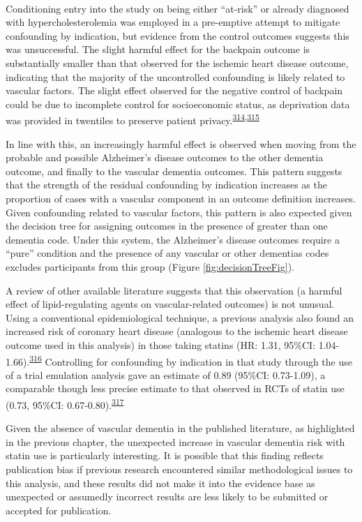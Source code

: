 \documentclass[a4paper, twoside]{templates/ociamthesis}
\begin{document}
~

Conditioning entry into the study on being either ``at-risk'' or already diagnosed with hypercholesterolemia was employed in a pre-emptive attempt to mitigate confounding by indication, but evidence from the control outcomes suggests this was unsuccessful. The slight harmful effect for the backpain outcome is substantially smaller than that observed for the ischemic heart disease outcome, indicating that the majority of the uncontrolled confounding is likely related to vascular factors. The slight effect observed for the negative control of backpain could be due to incomplete control for socioeconomic status, as deprivation data was provided in twentiles to preserve patient privacy.\textsuperscript{\protect\hyperlink{ref-boruzs2016}{314},\protect\hyperlink{ref-ikeda2019}{315}}

In line with this, an increasingly harmful effect is observed when moving from the probable and possible Alzheimer's disease outcomes to the other dementia outcome, and finally to the vascular dementia outcomes. This pattern suggests that the strength of the residual confounding by indication increases as the proportion of cases with a vascular component in an outcome definition increases. Given confounding related to vascular factors, this pattern is also expected given the decision tree for assigning outcomes in the presence of greater than one dementia code. Under this system, the Alzheimer's disease outcomes require a ``pure'' condition and the presence of any vascular or other dementias codes excludes participants from this group (Figure \ref{fig:decisionTreeFig}).

A review of other available literature suggests that this observation (a harmful effect of lipid-regulating agents on vascular-related outcomes) is not unusual. Using a conventional epidemiological technique, a previous analysis also found an increased risk of coronary heart disease (analogous to the ischemic heart disease outcome used in this analysis) in those taking statins (HR: 1.31, 95\%CI: 1.04-1.66).\textsuperscript{\protect\hyperlink{ref-danaei2013}{316}} Controlling for confounding by indication in that study through the use of a trial emulation analysis gave an estimate of 0.89 (95\%CI: 0.73-1.09), a comparable though less precise estimate to that observed in RCTs of statin use (0.73, 95\%CI: 0.67-0.80).\textsuperscript{\protect\hyperlink{ref-taylor2013}{317}}

Given the absence of vascular dementia in the published literature, as highlighted in the previous chapter, the unexpected increase in vascular dementia risk with statin use is particularly interesting. It is possible that this finding reflects publication bias if previous research encountered similar methodological issues to this analysis, and these results did not make it into the evidence base as unexpected or assumedly incorrect results are less likely to be submitted or accepted for publication.
\end{document}
